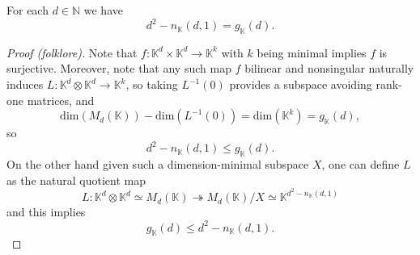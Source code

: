 \documentclass[10pt,a4paper]{amsart}
\begin{document}
\begin{proposition}
For each $d\in \mathbb{N}$ we have
\begin{equation*}
	d^2
-
	n_{\mathbb K}(d,1)
=
	g_{\mathbb K}(d).
    \end{equation*}
\end{proposition}

\begin{proof}[Proof (folklore)]
Note that $f\colon\mathbb K^d\times \mathbb K^d\to \mathbb K^k$
with $k$ being minimal implies $f$ is surjective.
Moreover, note that any such map $f$ bilinear and nonsingular
naturally induces
$L\colon \mathbb K^d\otimes \mathbb K^d\to \mathbb K^{k}$,
so taking $L^{-1}(0)$ provides a subspace
avoiding rank-one matrices, and 
\begin{equation*}
	\mathrm{dim}(M_d(\mathbb K))
-
	\mathrm{dim}(L^{-1}(0))
=
	\mathrm{dim}(\mathbb K^k)
=
	g_{\mathbb K}(d),
\end{equation*}
so 
\begin{equation*}
	d^2
-
	n_{\mathbb K}(d,1)
\le
	g_{\mathbb K}(d).
\end{equation*}
On the other hand given such a dimension-minimal subspace $X$,
one can define $L$ as the natural quotient map
\begin{equation*}
	L\colon 
	\mathbb K^d\otimes \mathbb K^d
\simeq
	M_d(\mathbb K)
\twoheadrightarrow
	M_d(\mathbb K)/X
\simeq
	\mathbb K^{d^2-n_{\mathbb K}(d,1)}
\end{equation*} 
and this implies
\begin{equation*}
	g_{\mathbb K}(d)
\le
	d^2
-
	n_{\mathbb K}(d,1).
\end{equation*}
 \end{proof}
\end{document}
